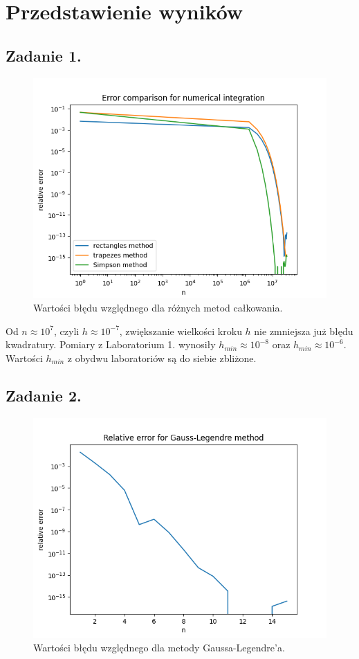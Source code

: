 \documentclass[11pt]{scrartcl}
\begin{document}
    \section{Przedstawienie wyników}
    \subsection{Zadanie 1.}
    \begin{figure}[H]
        \centering
        \includegraphics[width=0.8\linewidth]{integration_err.png}
        \caption{Wartości błędu względnego dla różnych metod
        całkowania.}
    \end{figure}

    Od $n \approx 10^7$, czyli $h \approx 10^{-7}$, zwiększanie
    wielkości kroku $h$ nie zmniejsza już błędu kwadratury. Pomiary
    z Laboratorium 1. wynosiły $h_{min} \approx 10^{-8}$ oraz $h_{min}
    \approx 10^{-6}$. Wartości $h_{min}$ z obydwu laboratoriów są do
    siebie zbliżone.

    \subsection{Zadanie 2.}
    \begin{figure}[H]
        \centering
        \includegraphics[width=0.8\linewidth]{gauss-legendre_err.png}
        \caption{Wartości błędu względnego dla metody
        Gaussa-Legendre'a.}
    \end{figure}
\end{document}

